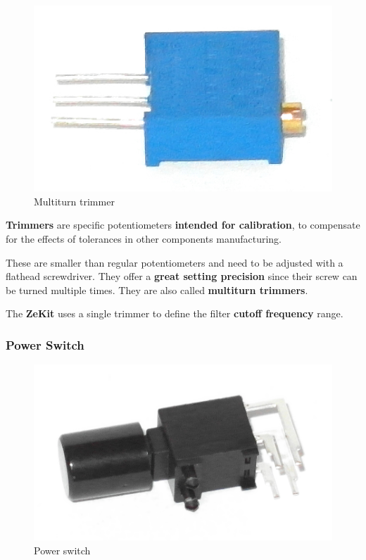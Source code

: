 \documentclass{scrartcl}
\begin{document}
\begin{figure}[!ht]
    \begin{center}
        \includegraphics[scale=0.20]{assets/zekit-trimmer.jpg}
        \caption{Multiturn trimmer}
    \end{center}
\end{figure}

\textbf{Trimmers} are specific potentiometers \textbf{intended for calibration}, to compensate for the effects of tolerances in other components manufacturing.

These are smaller than regular potentiometers and need to be adjusted with a flathead screwdriver. They offer a \textbf{great setting precision} since their screw can be turned multiple times. They are also called \textbf{multiturn trimmers}.

The \textbf{ZeKit} uses a single trimmer to define the filter \textbf{cutoff frequency} range.

\subsubsection{Power Switch}

\begin{figure}[!ht]
    \begin{center}
        \includegraphics[scale=0.18]{assets/zekit-power.jpg}
        \caption{Power switch}
    \end{center}
\end{figure}
\end{document}
